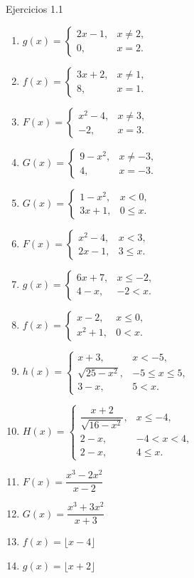 \documentclass[aspectratio=169,10pt]{beamer}
\begin{document}
\begin{frame}{Ejercicios 1.1}
\begin{enumerate}
\item $g(x)=\begin{cases}2x-1,&x\ne2,\\0,&x=2.\end{cases}$
\item $f(x)=\begin{cases}3x+2,&x\ne1,\\8,&x=1.\end{cases}$
\item $F(x)=\begin{cases}x^2-4,&x\ne3,\\-2,&x=3.\end{cases}$
\item $G(x)=\begin{cases}9-x^2,&x\ne-3,\\4,&x=-3.\end{cases}$
\item $G(x)=\begin{cases}1-x^2,&x<0,\\3x+1,&0\le x.\end{cases}$
\item $F(x)=\begin{cases}x^2-4,&x<3,\\2x-1,&3\le x.\end{cases}$
\item $g(x)=\begin{cases}6x+7,&x\le-2,\\4-x,&-2<x.\end{cases}$
\item $f(x)=\begin{cases}x-2,&x\le0,\\x^2+1,&0<x.\end{cases}$
\item $h(x)=\begin{cases}x+3,&x<-5,\\\sqrt{25-x^2},&-5\le x\le5,\\3-x,&5<x.\end{cases}$
\item $H(x)=\begin{cases}\dfrac{x+2}{\sqrt{16-x^2}},&x\le-4,\\2-x,&-4<x<4,\\2-x,&4\le x.\end{cases}$
\item $F(x)=\dfrac{x^3-2x^2}{x-2}$
\item $G(x)=\dfrac{x^3+3x^2}{x+3}$
\item $f(x)=\lfloor x-4\rfloor$
\item $g(x)=\lfloor x+2\rfloor$
\end{enumerate}


\end{frame}
\end{document}
